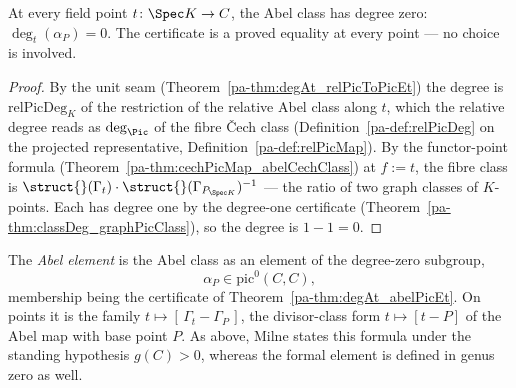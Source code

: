 \begin{theorem}
  \label{pa-thm:degAt_abelPicEt}
  \leanok

  At every field point \(t \colon \Spec K \to C\), the Abel class has degree zero:
  \(\deg_t(\alpha_P) = 0\). The certificate is a proved equality at every point — no
  choice is involved.
\end{theorem}
\begin{proof}
  \leanok
  By the unit seam (Theorem~\ref{pa-thm:degAt_relPicToPicEt}) the degree is
  \(\mathrm{relPicDeg}_K\) of the restriction of the relative Abel class along \(t\), which
  the relative degree reads as \(\deg_{\Pic}\) of the fibre \v Cech class
  (Definition~\ref{pa-def:relPicDeg} on the projected representative,
  Definition~\ref{pa-def:relPicMap}). By the functor-point formula
  (Theorem~\ref{pa-thm:cechPicMap_abelCechClass}) at \(f := t\), the fibre class is
  \(\struct{}(\Gamma_t) \cdot \struct{}(\Gamma_{P_{\Spec K}})^{-1}\) — the ratio of two
  graph classes of \(K\)-points. Each has degree one by the degree-one certificate
  (Theorem~\ref{pa-thm:classDeg_graphPicClass}), so the degree is \(1 - 1 = 0\).
\end{proof}

\begin{definition}
  \label{pa-def:abelElement}
  \leanok


  The \emph{Abel element} is the Abel class as an element of the degree-zero subgroup,
  \[
    \alpha_P \in \mathrm{pic}^0(C, C),
  \]
  membership being the certificate of Theorem~\ref{pa-thm:degAt_abelPicEt}. On points it is the
  family \(t \mapsto [\,\Gamma_t - \Gamma_P\,]\), the divisor-class form \(t \mapsto [t - P]\)
  of the Abel map with base point \(P\). As above, Milne states this formula under the
  standing hypothesis \(g(C)>0\), whereas the formal element is defined in genus zero as
  well.
\end{definition}

